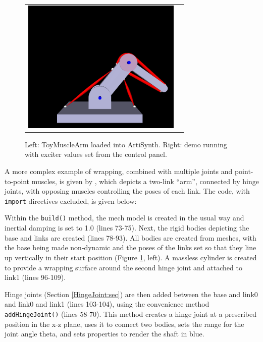 \begin{figure}[h]
\begin{center}
\begin{tabular}{cc}
       \includegraphics[width=3in]{images/ToyMuscleArmB}
     \fi
  \end{tabular}
\end{center}
\caption{Left: ToyMuscleArm loaded into ArtiSynth. Right:
demo running with exciter values set from the control panel.}
\label{ToyMuscleArm:fig}
\end{figure}

A more complex example of wrapping, combined with multiple joints and
point-to-point muscles, is given by , which depicts a two-link ``arm'',
connected by hinge joints, with opposing muscles controlling the poses of
each link. The code, with {\tt import} directives excluded, is given below:
\lstset{numbers=left} 
\iflatexml

\else

\fi
\lstset{numbers=none}

Within the {\tt build()} method, the mech model is created in the usual way and
inertial damping is set to 1.0 (lines 73-75). Next, the rigid bodies depicting
the base and links are created (lines 78-93). All bodies are created from
meshes, with the base being made non-dynamic and the poses of the links set so
that they line up vertically in their start position
(Figure \ref{ToyMuscleArm:fig}, left). A massless cylinder is created to
provide a wrapping surface around the second hinge joint and attached to link1
(lines 96-109). 

Hinge joints (Section \ref{HingeJoint:sec}) are then added between the base and
link0 and link0 and link1 (lines 103-104), using the convenience method {\tt
addHingeJoint()} (lines 58-70). This method creates a hinge joint at a prescribed
position in the x-z plane, uses it to connect two bodies, sets the range for
the joint angle {\sf theta}, and sets properties to render the shaft in blue.

